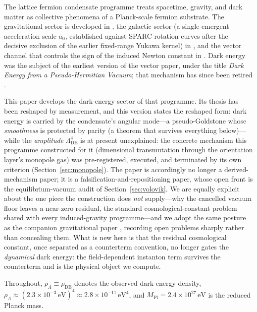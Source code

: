 \documentclass[11pt]{article}
\newcommand{\Mpl}{M_{\mathrm{Pl}}}
\newcommand{\rhoL}{\rho_\Lambda}
\newcommand{\LDE}{\Lambda_{\mathrm{DE}}}
\begin{document}
The lattice fermion condensate programme treats spacetime, gravity,
and dark matter as collective phenomena of a Planck-scale fermion
substrate.  The gravitational sector is developed in
\cite{Cheng:2026grav}, the galactic sector (a single emergent acceleration scale $a_0$,
established against SPARC rotation curves after the decisive exclusion
of the earlier fixed-range Yukawa kernel) in
\cite{Cheng:2025sparc}, and the vector channel that controls the
sign of the induced Newton constant in \cite{Cheng:2026vector}.
Dark energy was the subject of the earliest version of the vector
paper, under the title \emph{Dark Energy from a Pseudo-Hermitian
Vacuum}; that mechanism has since been retired
\cite{Cheng:2026vector}.

This paper develops the dark-energy sector of that programme.  Its
thesis has been reshaped by measurement, and this version states the
reshaped form: dark energy is carried by the condensate's angular
mode---a pseudo-Goldstone whose \emph{smoothness} is protected by
parity (a theorem that survives everything below)---while the
\emph{amplitude} $\LDE^4$ is at present unexplained: the concrete
mechanism this programme constructed for it (dimensional transmutation
through the orientation layer's monopole gas) was pre-registered,
executed, and terminated by its own criterion
(Section~\ref{sec:monopole}).  The paper is accordingly no longer a
derived-mechanism paper; it is a falsification-and-repositioning
paper, whose open front is the equilibrium-vacuum audit of
Section~\ref{sec:volovik}.  We are
equally explicit about the one piece the construction does \emph{not}
supply---why the cancelled vacuum floor leaves a near-zero residual,
the standard cosmological-constant problem shared with every
induced-gravity programme---and we adopt the same posture as the
companion gravitational paper \cite{Cheng:2026grav}, recording open
problems sharply rather than concealing them.  What is new here is that
the residual cosmological constant, once separated as a counterterm
convention, no longer gates the \emph{dynamical} dark energy: the
field-dependent instanton term survives the counterterm and is the
physical object we compute.

Throughout, $\rhoL \equiv \rho_{\mathrm{DE}}$ denotes the observed
dark-energy density, $\rhoL \approx (2.3\times10^{-3}\,
\mathrm{eV})^4 \approx 2.8\times10^{-11}\,\mathrm{eV}^4$, and
$\Mpl = 2.4\times10^{27}\,\mathrm{eV}$ is the reduced Planck mass.

\end{document}
